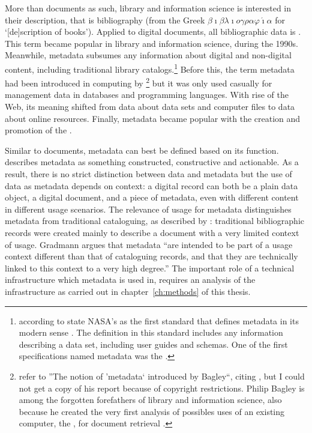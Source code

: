 More than documents as such, library and information science is interested in
their description, that is bibliography (from the Greek $\beta \imath \beta
\lambda \imath o \gamma \rho \alpha \varphi \acute{\imath} \alpha$ for
`[de]scription of books'). Applied to digital documents, all bibliographic data
is . This term became popular in library and information
science, during the 1990s. Meanwhile, metadata subsumes any information about
digital and non-digital content, including traditional library
catalogs.\footnote{\textcite{Shelley1995} according to \textcite{Caplan2003}
state NASA's  as the first standard
that defines metadata in its modern sense \cite[F-10]{DIF1988}. The definition
in this standard includes any information describing a data set, including user
guides and schemas. One of the first specifications named metadata was the
 \cite{CSDSM1994}.}
Before this, the term metadata had been introduced in computing by
\textcite{Bagley1968}\footnote{\textcite{Solntseff1974} refer to ''The notion
of 'metadata` introduced by Bagley``, citing \textcite{Bagley1968}, but I could
not get a copy of his report because of copyright restrictions. Philip Bagley
is among the forgotten forefathers of library and information science, also
because he created the very first analysis of possibles uses of an existing
computer, the , for document retrieval \cite{Bagley1951}.}
but it was only used casually for management data in databases and programming
languages.  With rise of the Web, its meaning shifted from data about data sets
and computer files to data about online resources. Finally, metadata became
popular with the creation and promotion of the .

Similar to documents, metadata can best be defined based on its function.
\textcite{Coyle2010} describes metadata as something constructed, constructive
and actionable. As a result, there is no strict distinction between data and
metadata but the use of data as metadata depends on context: a digital record
can both be a plain data object, a digital document, and a piece of metadata,
even with different content in different usage scenarios. The relevance of
usage for metadata distinguishes metadata from traditional cataloguing, as
described by \textcite{Gradmann1998}: traditional bibliographic records were
created mainly to describe a document with a very limited context of usage.
Gradmann argues that metadata ``are intended to be part of a usage context
different than that of cataloguing records, and that they are technically
linked to this context to a very high degree.'' The important role of a
technical infrastructure which metadata is used in, requires an analysis of
the infrastructure as carried out in chapter~\ref{ch:methods} of this thesis.

